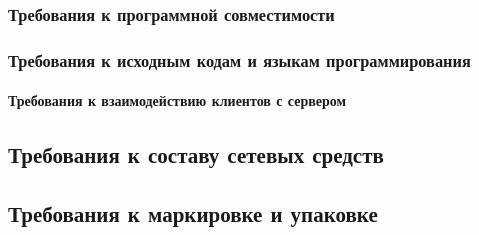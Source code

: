 \subsubsection{Требования к программной совместимости}

\subsubsection{Требования к исходным кодам и языкам программирования}

\paragraph{Требования к взаимодействию клиентов с сервером}

\subsection{Требования к составу сетевых средств}


\subsection{Требования к маркировке и упаковке}


